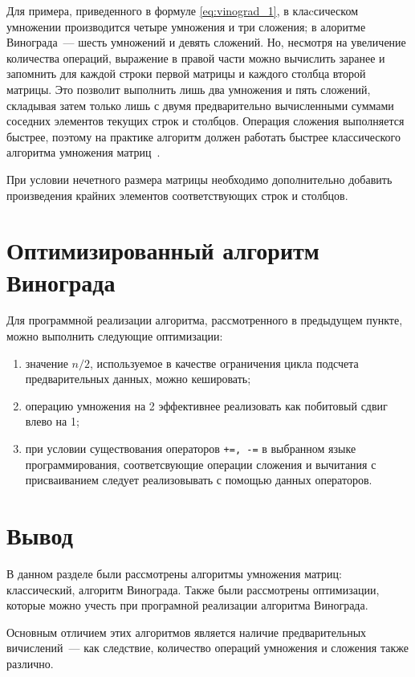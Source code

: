 Для примера, приведенного в формуле \ref{eq:vinograd_1}, в клаcсическом умножении производится четыре умножения и три сложения; в алоритме Винограда~--- шесть умножений и девять сложений. Но, несмотря на увеличение количества операций, 
выражение в правой части можно вычислить заранее и запомнить для каждой строки первой матрицы и каждого столбца второй матрицы.
Это позволит выполнить лишь два умножения и пять сложений, складывая затем только лишь с двумя предварительно вычисленными суммами соседних элементов текущих строк и столбцов. Операция сложения выполняется быстрее, поэтому на практике алгоритм должен работать
быстрее классического алгоритма умножения матриц~\cite{vinograd-alg}.

При условии нечетного размера матрицы необходимо дополнительно добавить произведения крайних элементов соответствующих строк и столбцов.

\section{Оптимизированный алгоритм Винограда}
Для программной реализации алгоритма, рассмотренного в предыдущем пункте, можно выполнить следующие оптимизации:
\begin{enumerate}
    \item значение $n / 2$, используемое в качестве ограничения цикла подсчета предварительных данных, можно кешировать;
    \item операцию умножения на 2 эффективнее реализовать как побитовый сдвиг влево на 1;
    \item при условии существования операторов \texttt{+=, -=} в выбранном языке программирования, соответсвующие операции сложения и вычитания с присваиванием следует реализовывать с помощью данных операторов.
\end{enumerate}

\section*{Вывод}
В данном разделе были рассмотрены алгоритмы умножения матриц: классический, алгоритм Винограда. Также были рассмотрены оптимизации, которые можно учесть при програмной реализации алгоритма Винограда.

Основным отличием этих алгоритмов является наличие предварительных вичислений~--- как следствие, количество операций умножения и сложения также различно.